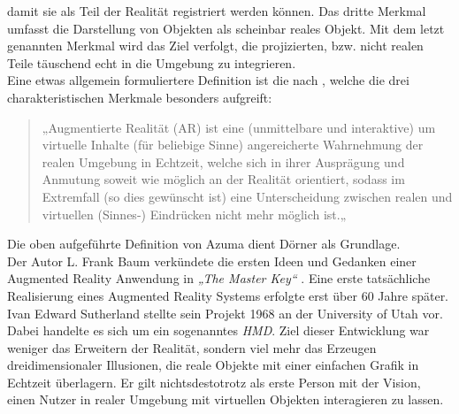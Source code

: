 damit sie als Teil der Realität registriert werden können. Das dritte Merkmal umfasst die Darstellung von Objekten als scheinbar reales 
Objekt. Mit dem letzt genannten Merkmal wird das Ziel verfolgt, die projizierten, bzw. nicht realen Teile täuschend echt in die Umgebung zu 
integrieren.
\\ 
\linebreak  
Eine etwas allgemein formuliertere Definition ist die nach \cite{springer.2019s}, welche die drei charakteristischen Merkmale besonders 
aufgreift:
\begin{quote}
    „Augmentierte Realität (AR) ist eine (unmittelbare und interaktive) um virtuelle Inhalte (für beliebige Sinne) angereicherte Wahrnehmung der 
    realen Umgebung in Echtzeit, welche sich in ihrer Ausprägung und Anmutung soweit wie möglich an der Realität orientiert, sodass im 
    Extremfall (so dies gewünscht ist) eine Unterscheidung zwischen realen und virtuellen (Sinnes-) Eindrücken nicht mehr möglich ist.„ \cite{springer.2019s}
\end{quote}
Die oben aufgeführte Definition von Azuma dient Dörner als Grundlage.
\\ 
\linebreak
Der Autor L. Frank Baum \cite{frankbaum.1856m} verkündete die ersten Ideen und Gedanken einer Augmented Reality Anwendung in 
\textit{„The Master Key“} \cite{masterkey.1996f}. Eine erste tatsächliche Realisierung eines Augmented Reality Systems erfolgte erst über 
60 Jahre später. Ivan Edward Sutherland \cite{sutherlandbio.1938m} stellte sein Projekt 1968 an der University of Utah vor. Dabei handelte es 
sich um ein sogenanntes \textit{\ac{HMD}}. Ziel dieser Entwicklung war weniger das Erweitern der Realität, sondern viel mehr das Erzeugen dreidimensionaler 
Illusionen, die reale Objekte mit einer einfachen Grafik in Echtzeit überlagern. %
Er gilt nichtsdestotrotz als erste Person mit der Vision, einen Nutzer in realer Umgebung mit virtuellen Objekten interagieren zu lassen.

